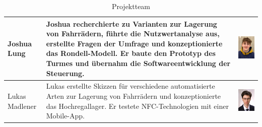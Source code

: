 \begin{table}[H]
\begin{center}
\begin{tabular}{|p{}|p{}|p{}|}
      Joshua Lung    & Joshua recherchierte zu Varianten zur Lagerung von Fahrrädern, führte die Nutzwertanalyse aus, erstellte Fragen der Umfrage und konzeptionierte das Rondell-Modell. Er baute den Prototyp des Turmes und übernahm die Softwareentwicklung der Steuerung. & \begin{minipage}{.3\textwidth}\includegraphics{images/joshualung.jpg} \end{minipage}    \\
      \hline
      Lukas Madlener & Lukas erstellte Skizzen für verschiedene automatisierte Arten zur Lagerung von Fahrrädern und konzeptionierte das Hochregallager. Er testete NFC-Technologien mit einer Mobile-App.                                                                      & \begin{minipage}{.3\textwidth}\includegraphics{images/lukasmadlener.jpg} \end{minipage} \\
      \hline
    \end{tabular}
    \caption{Projektteam}
    \label{tab:projektteam}
  \end{center}
\end{table}

